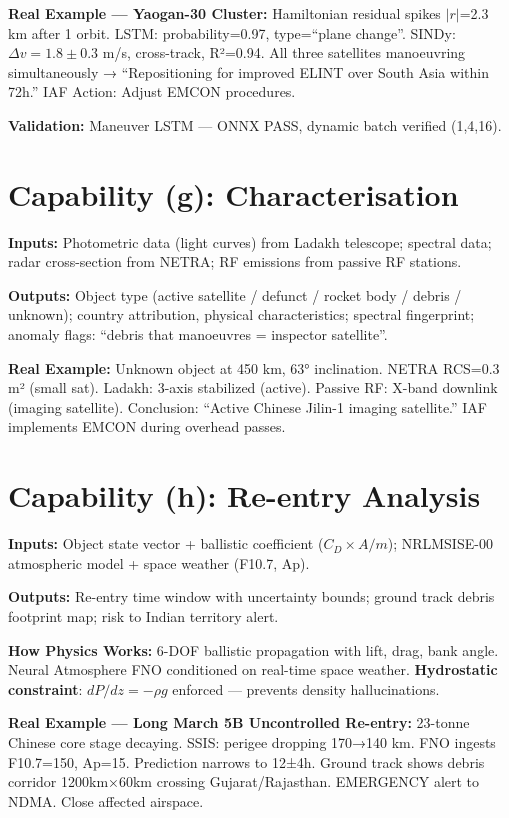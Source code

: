 \documentclass[11pt,a4paper]{article}
\begin{document}
\textbf{Real Example --- Yaogan-30 Cluster:} Hamiltonian residual spikes $|r|$=2.3 km after 1 orbit. LSTM: probability=0.97, type=``plane change''. SINDy: $\Delta v=1.8\pm0.3$ m/s, cross-track, R²=0.94. All three satellites manoeuvring simultaneously → ``Repositioning for improved ELINT over South Asia within 72h.'' IAF Action: Adjust EMCON procedures.

\textbf{Validation:} Maneuver LSTM --- ONNX PASS, dynamic batch verified (1,4,16).

\section{Capability (g): Characterisation}

\textbf{Inputs:} Photometric data (light curves) from Ladakh telescope; spectral data; radar cross-section from NETRA; RF emissions from passive RF stations.

\textbf{Outputs:} Object type (active satellite / defunct / rocket body / debris / unknown); country attribution, physical characteristics; spectral fingerprint; anomaly flags: ``debris that manoeuvres = inspector satellite''.

\textbf{Real Example:} Unknown object at 450 km, 63° inclination. NETRA RCS=0.3 m² (small sat). Ladakh: 3-axis stabilized (active). Passive RF: X-band downlink (imaging satellite). Conclusion: ``Active Chinese Jilin-1 imaging satellite.'' IAF implements EMCON during overhead passes.

\section{Capability (h): Re-entry Analysis}

\textbf{Inputs:} Object state vector + ballistic coefficient ($C_D \times A/m$); NRLMSISE-00 atmospheric model + space weather (F10.7, Ap).

\textbf{Outputs:} Re-entry time window with uncertainty bounds; ground track debris footprint map; risk to Indian territory alert.

\textbf{How Physics Works:} 6-DOF ballistic propagation with lift, drag, bank angle. Neural Atmosphere FNO conditioned on real-time space weather. \textbf{Hydrostatic constraint}: $dP/dz = -\rho g$ enforced --- prevents density hallucinations.

\textbf{Real Example --- Long March 5B Uncontrolled Re-entry:} 23-tonne Chinese core stage decaying. SSIS: perigee dropping 170→140 km. FNO ingests F10.7=150, Ap=15. Prediction narrows to 12±4h. Ground track shows debris corridor 1200km×60km crossing Gujarat/Rajasthan. EMERGENCY alert to NDMA. Close affected airspace.
\end{document}
